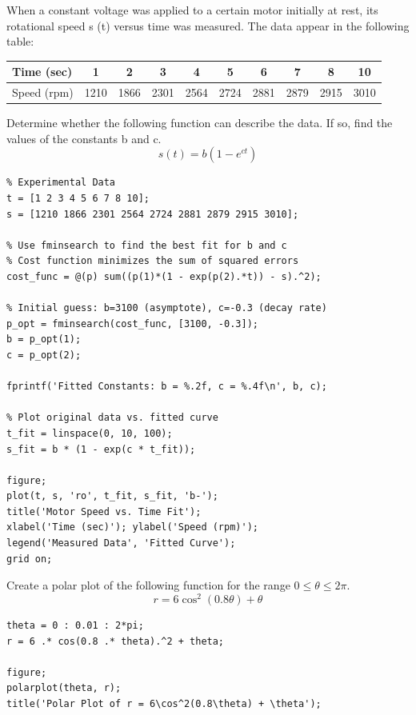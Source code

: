 When a constant voltage was applied to a certain motor initially at rest, its rotational speed s (t) versus time was measured. 
The data appear in the following table: 

\begin{table}[h]
\centering
\begin{tabular}{|l|c|c|c|c|c|c|c|c|c|}
\hline
Time (sec) & 1 & 2 & 3 & 4 & 5 & 6 & 7 & 8 & 10 \\
\hline
Speed (rpm) & 1210 & 1866 & 2301 & 2564 & 2724 & 2881 & 2879 & 2915 & 3010 \\
\hline
\end{tabular}
\end{table} 

Determine whether the following function can describe the data. If so, find the values of the constants b and c. 
$$s(t)=b(1-e^{ct})$$


\begin{lstlisting}
% Experimental Data
t = [1 2 3 4 5 6 7 8 10];
s = [1210 1866 2301 2564 2724 2881 2879 2915 3010];

% Use fminsearch to find the best fit for b and c
% Cost function minimizes the sum of squared errors
cost_func = @(p) sum((p(1)*(1 - exp(p(2).*t)) - s).^2);

% Initial guess: b=3100 (asymptote), c=-0.3 (decay rate)
p_opt = fminsearch(cost_func, [3100, -0.3]);
b = p_opt(1);
c = p_opt(2);

fprintf('Fitted Constants: b = %.2f, c = %.4f\n', b, c);

% Plot original data vs. fitted curve
t_fit = linspace(0, 10, 100);
s_fit = b * (1 - exp(c * t_fit));

figure;
plot(t, s, 'ro', t_fit, s_fit, 'b-');
title('Motor Speed vs. Time Fit');
xlabel('Time (sec)'); ylabel('Speed (rpm)');
legend('Measured Data', 'Fitted Curve');
grid on;
\end{lstlisting}

Create a polar plot of the following function for the range $0\le\theta\le2\pi.$ 
$$r=6 \cos^{2}(0.8\theta)+\theta$$ 

\begin{lstlisting}
theta = 0 : 0.01 : 2*pi;
r = 6 .* cos(0.8 .* theta).^2 + theta;

figure;
polarplot(theta, r);
title('Polar Plot of r = 6\cos^2(0.8\theta) + \theta');
\end{lstlisting}

